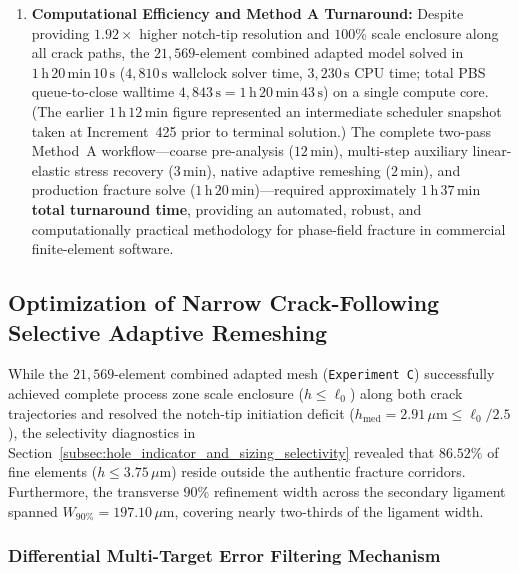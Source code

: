 \begin{enumerate}
  \item \textbf{Computational Efficiency and Method A Turnaround:} Despite providing $1.92\times$ higher notch-tip resolution and $100\%$ scale enclosure along all crack paths, the $21{,}569$-element combined adapted model solved in $1\,\mathrm{h}\,20\,\mathrm{min}\,10\,\mathrm{s}$ ($4{,}810\,\mathrm{s}$ wallclock solver time, $3{,}230\,\mathrm{s}$ CPU time; total PBS queue-to-close walltime $4{,}843\,\mathrm{s} = 1\,\mathrm{h}\,20\,\mathrm{min}\,43\,\mathrm{s}$) on a single compute core. (The earlier $1\,\mathrm{h}\,12\,\mathrm{min}$ figure represented an intermediate scheduler snapshot taken at Increment~425 prior to terminal solution.) The complete two-pass Method~A workflow---coarse pre-analysis ($12\,\mathrm{min}$), multi-step auxiliary linear-elastic stress recovery ($3\,\mathrm{min}$), native adaptive remeshing ($2\,\mathrm{min}$), and production fracture solve ($1\,\mathrm{h}\,20\,\mathrm{min}$)---required approximately \textbf{$1\,\mathrm{h}\,37\,\mathrm{min}$ total turnaround time}, providing an automated, robust, and computationally practical methodology for phase-field fracture in commercial finite-element software.
\end{enumerate}

\subsection{Optimization of Narrow Crack-Following Selective Adaptive Remeshing}
\label{subsec:hole_selective_remeshing}

While the $21{,}569$-element combined adapted mesh (\texttt{Experiment C}) successfully achieved complete process zone scale enclosure ($h \le \ell_0$) along both crack trajectories and resolved the notch-tip initiation deficit ($h_{\mathrm{med}} = 2.91\,\mu\mathrm{m} \le \ell_0/2.5$), the selectivity diagnostics in Section~\ref{subsec:hole_indicator_and_sizing_selectivity} revealed that $86.52\%$ of fine elements ($h \le 3.75\,\mu\mathrm{m}$) reside outside the authentic fracture corridors. Furthermore, the transverse $90\%$ refinement width across the secondary ligament spanned $W_{90\%} = 197.10\,\mu\mathrm{m}$, covering nearly two-thirds of the ligament width.

\subsubsection{Differential Multi-Target Error Filtering Mechanism}
\label{subsubsec:differential_error_filtering}

